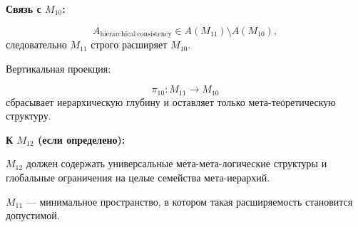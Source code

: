 \textbf{Связь с $M_{10}$:}

\[
A_{\mathrm{hierarchical\ consistency}} \in A(M_{11}) \setminus A(M_{10}),
\]
следовательно $M_{11}$ строго расширяет $M_{10}$.

Вертикальная проекция:

\[
\pi_{10}: M_{11} \to M_{10}
\]
сбрасывает иерархическую глубину и оставляет только мета-теоретическую структуру.

\textbf{К $M_{12}$ (если определено):}

$M_{12}$ должен содержать универсальные мета-мета-логические структуры и
глобальные ограничения на целые семейства мета-иерархий.

$M_{11}$ — минимальное пространство, в котором такая расширяемость становится допустимой.
